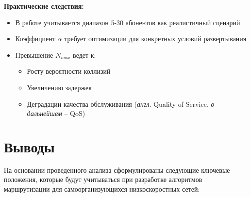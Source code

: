 \textbf{Практические следствия:}
\begin{itemize}
    \item В работе учитывается диапазон 5-30 абонентов как реалистичный сценарий
    \item Коэффициент $\alpha$ требует оптимизации для конкретных условий развертывания
    \item Превышение $N_{max}$ ведет к:
    \begin{itemize}
        \item Росту вероятности коллизий
        \item Увеличению задержек
        \item Деградации качества обслуживания (\textit{англ.} Quality of Service, \textit{в дальнейшем} -- QoS)
    \end{itemize}
\end{itemize}

\section{Выводы} \label{ch1:conclusion}

На основании проведенного анализа сформулированы следующие ключевые положения, которые будут учитываться при разработке алгоритмов маршрутизации для 
самоорганизующихся низкоскоростных сетей:

